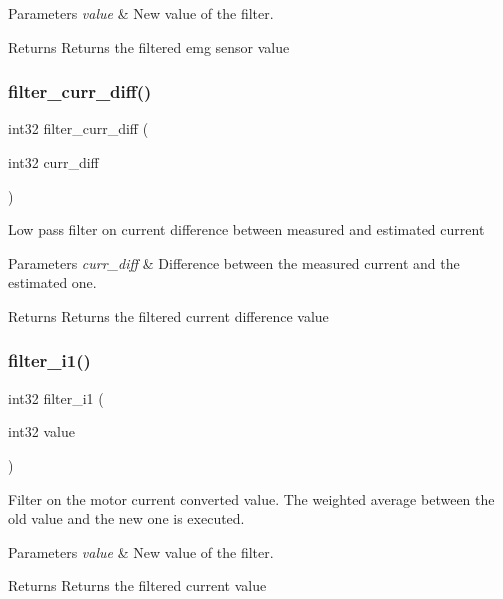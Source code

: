 \begin{DoxyParams}{Parameters}
{\em value} & New value of the filter.\\
\hline
\end{DoxyParams}
\begin{DoxyReturn}{Returns}
Returns the filtered emg sensor value 
\end{DoxyReturn}
\mbox{\label{utils_8c_a72883337efd7b70b783e426c47ecf689}} 
\subsubsection{filter\+\_\+curr\+\_\+diff()}
{\footnotesize\ttfamily int32 filter\+\_\+curr\+\_\+diff (\begin{DoxyParamCaption}\item[{int32}]{curr\+\_\+diff }\end{DoxyParamCaption})}

Low pass filter on current difference between measured and estimated current


\begin{DoxyParams}{Parameters}
{\em curr\+\_\+diff} & Difference between the measured current and the estimated one.\\
\hline
\end{DoxyParams}
\begin{DoxyReturn}{Returns}
Returns the filtered current difference value 
\end{DoxyReturn}
\mbox{\label{utils_8c_ad3131df52849d030b02010f285481ba6}} 
\subsubsection{filter\+\_\+i1()}
{\footnotesize\ttfamily int32 filter\+\_\+i1 (\begin{DoxyParamCaption}\item[{int32}]{value }\end{DoxyParamCaption})}

Filter on the motor current converted value. The weighted average between the old value and the new one is executed.


\begin{DoxyParams}{Parameters}
{\em value} & New value of the filter.\\
\hline
\end{DoxyParams}
\begin{DoxyReturn}{Returns}
Returns the filtered current value 
\end{DoxyReturn}
\mbox{\label{utils_8c_af034fe9aa479d4adfc6e75e20b2f7ff3}} 
